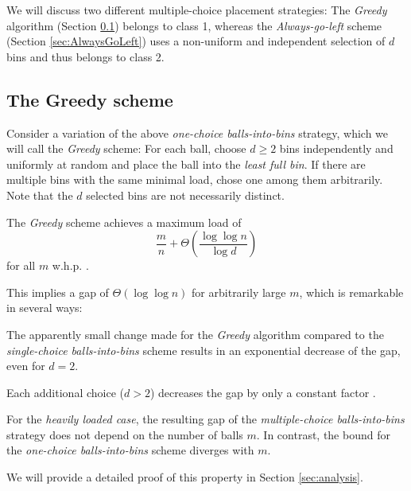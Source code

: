 \documentclass[a4paper,12pt]{article}
\newcommand\todo[1]{\textcolor{red}{(#1)}}
\begin{document}
We will discuss two different multiple-choice placement strategies: The \emph{Greedy} algorithm (Section \ref{sec:greedy}) belongs to class 1, whereas the \emph{Always-go-left} scheme (Section \ref{sec:AlwaysGoLeft}) uses a non-uniform and independent selection of $d$ bins and thus belongs to class 2.

\subsection{The Greedy scheme}
\label{sec:greedy}

Consider a variation of the above \emph{one-choice balls-into-bins} strategy, which we will call the \emph{Greedy} scheme: For each ball, choose $d \geq 2$ bins independently and uniformly at random and place the ball into the \emph{least full bin}. If there are multiple bins with the same minimal load, chose one among them arbitrarily. Note that the $d$ selected bins are not necessarily distinct. 

The \emph{Greedy} scheme achieves a maximum load of 
\[
\frac{m}{n} + \Theta\left(\frac{\log \log n}{\log d} \right)
\]
for all $m$ w.h.p. \cite{ABKU99} \cite{BCSV06}.

This implies a gap of $\Theta\left(\log \log n \right)$ for arbitrarily large $m$, which is remarkable in several ways:
\begin{compactitem}
\item The apparently small change made for the \emph{Greedy} algorithm compared to the \emph{single-choice balls-into-bins} scheme results in an exponential decrease of the gap, even for $d=2$. 
\item Each additional choice ($d > 2$) decreases the gap by only a constant factor \cite{MRS01}. 
\item For the \emph{heavily loaded case}, the resulting gap of the \emph{multiple-choice balls-into-bins} strategy does not depend on the number of balls $m$. In contrast, the bound for the \emph{one-choice balls-into-bins} scheme diverges with $m$.
\begin{comment}
\todo{the following is only true for class 1 algorithms}
\item The given bounds are \emph{tight}, meaning that no other strategy that places each ball into one of $d$ randomly selected bins achieves a gap that is asymptotically lower.
\end{comment}
\end{compactitem}

We will provide a detailed proof of this property in Section \ref{sec:analysis}.
\end{document}

